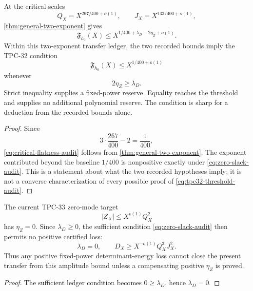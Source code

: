 \begin{theorem}
\label{thm:zero-slack-audit}
At the critical scales
\begin{equation}
 Q_X=X^{267/400+o(1)},\qquad
 J_X=X^{133/400+o(1)},
\label{eq:critical-scales-audit}
\end{equation}
\cref{thm:general-two-exponent} gives
\begin{equation}
\boxed{
 \mathfrak F_{h_0}(X)
 \le
 X^{1/400+\lambda_D-2\eta_Z+o(1)}.}
\label{eq:critical-flatness-audit}
\end{equation}
Within this two-exponent transfer ledger, the two recorded bounds
imply the TPC-32 condition
\begin{equation}
 \mathfrak F_{h_0}(X)\le X^{1/400+o(1)}
\label{eq:tpc32-threshold-audit}
\end{equation}
whenever
\begin{equation}
\boxed{2\eta_Z\ge\lambda_D.}
\label{eq:zero-slack-audit}
\end{equation}
Strict inequality supplies a fixed-power reserve.  Equality reaches
the threshold and supplies no additional polynomial reserve.  The
condition is sharp for a deduction from the recorded bounds alone.
\end{theorem}

\begin{proof}
Since
\[
 3\cdot\frac{267}{400}-2=\frac1{400},
\]
\eqref{eq:critical-flatness-audit} follows from
\cref{thm:general-two-exponent}.  The exponent contributed beyond
the baseline \(1/400\) is nonpositive exactly under
\eqref{eq:zero-slack-audit}.  This is a statement about what the
two recorded hypotheses imply; it is not a converse characterization
of every possible proof of \eqref{eq:tpc32-threshold-audit}.
\end{proof}

\begin{corollary}
\label{cor:natural-energy-audit}
The current TPC-33 zero-mode target
\[
 |Z_X|\le X^{o(1)}Q_X^2
\]
has \(\eta_Z=0\).  Since \(\lambda_D\ge0\), the sufficient condition
\eqref{eq:zero-slack-audit} then permits no positive certified loss:
\[
 \lambda_D=0,\qquad
 D_X\ge X^{-o(1)}Q_X^3J_X^2.
\]
Thus any positive fixed-power determinant-energy loss cannot close
the present transfer from this amplitude bound unless a compensating
positive
\(\eta_Z\) is proved.
\end{corollary}

\begin{proof}
The sufficient ledger condition becomes \(0\ge\lambda_D\), hence
\(\lambda_D=0\).
\end{proof}

